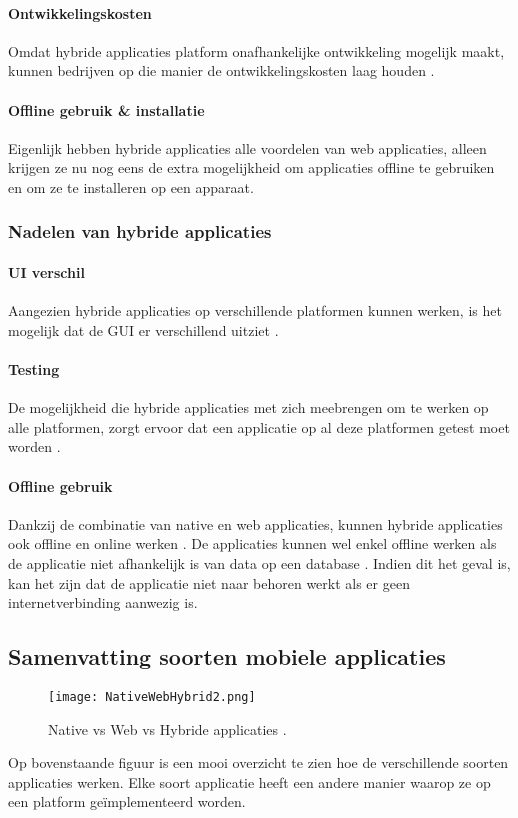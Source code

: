 \paragraph{Ontwikkelingskosten}
Omdat hybride applicaties platform onafhankelijke ontwikkeling mogelijk maakt, kunnen 
bedrijven op die manier de ontwikkelingskosten laag houden \autocite{Budiu2016}. 

\paragraph{Offline gebruik \& installatie}
Eigenlijk hebben hybride applicaties alle voordelen van web applicaties, alleen krijgen ze 
nu nog eens de extra mogelijkheid om applicaties offline te gebruiken en om ze te 
installeren op een apparaat.

\subsubsection{Nadelen van hybride applicaties}
\paragraph{UI verschil}
Aangezien hybride applicaties op verschillende platformen kunnen werken, is het 
mogelijk dat de GUI er verschillend uitziet \autocite{sgshradha2019}. 

\paragraph{Testing}
De mogelijkheid die hybride applicaties met zich meebrengen om te werken op alle platformen, 
zorgt ervoor dat een applicatie op al deze platformen getest moet worden \autocite{sgshradha2019}.

\paragraph{Offline gebruik}
Dankzij de combinatie van native en web applicaties, kunnen hybride applicaties ook offline 
en online werken \autocite{Khan2021}. De applicaties kunnen wel enkel offline werken als de 
applicatie niet afhankelijk is van data op een database \autocite{sgshradha2019}. Indien 
dit het geval is, kan het zijn dat de applicatie niet naar behoren werkt als er geen 
internetverbinding aanwezig is.

\subsection{Samenvatting soorten mobiele applicaties}
\begin{figure}[H]
    \centering
    \texttt{[image: NativeWebHybrid2.png]}
    \caption{Native vs Web vs Hybride applicaties \parencite{Merenych2021}.}
    \label{fig:NativeWebHybride}
\end{figure}
Op bovenstaande figuur is een mooi overzicht te zien hoe de verschillende 
soorten applicaties werken. Elke soort applicatie heeft een andere manier waarop ze 
op een platform geïmplementeerd worden.

